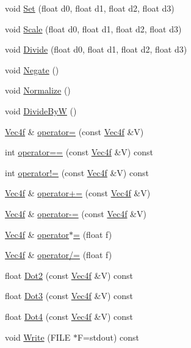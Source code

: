 \begin{DoxyCompactItemize}
\item 
void \hyperlink{classVec4f_aee24f98156cf8f6b7b2c82226c1b45b8}{Set} (float d0, float d1, float d2, float d3)
\item 
void \hyperlink{classVec4f_a4e278a1a03fc75d08b2479434d02a93b}{Scale} (float d0, float d1, float d2, float d3)
\item 
void \hyperlink{classVec4f_a15519ea147364b4f0f4d06f5ed2e84a0}{Divide} (float d0, float d1, float d2, float d3)
\item 
void \hyperlink{classVec4f_afde9b6639cddcd05e50939206070cae5}{Negate} ()
\item 
void \hyperlink{classVec4f_a778c0534a618a205c0e6d270d011a9f4}{Normalize} ()
\item 
void \hyperlink{classVec4f_a73189d23dbecc1961c06890d31eb7eec}{Divide\+By\+W} ()
\item 
\hyperlink{classVec4f}{Vec4f} \& \hyperlink{classVec4f_ad787eea4e2a08a293a21a00adaa52bfa}{operator=} (const \hyperlink{classVec4f}{Vec4f} \&V)
\item 
int \hyperlink{classVec4f_a39e556a72e87d2e7279bb6b743d7ff58}{operator==} (const \hyperlink{classVec4f}{Vec4f} \&V) const 
\item 
int \hyperlink{classVec4f_afd7d07212bb6dcfee2e98a22c163a902}{operator!=} (const \hyperlink{classVec4f}{Vec4f} \&V) const 
\item 
\hyperlink{classVec4f}{Vec4f} \& \hyperlink{classVec4f_a731b923867e74116577d8e6f7aab9b51}{operator+=} (const \hyperlink{classVec4f}{Vec4f} \&V)
\item 
\hyperlink{classVec4f}{Vec4f} \& \hyperlink{classVec4f_abe78d3c5c69e5669ca06c586ec66d59f}{operator-\/=} (const \hyperlink{classVec4f}{Vec4f} \&V)
\item 
\hyperlink{classVec4f}{Vec4f} \& \hyperlink{classVec4f_a13df49c47b3102d318e135839b81ca73}{operator$\ast$=} (float f)
\item 
\hyperlink{classVec4f}{Vec4f} \& \hyperlink{classVec4f_a4319a795f66c8aff5b48e8d3fc6e1bbb}{operator/=} (float f)
\item 
float \hyperlink{classVec4f_a7a3d362d70ab25253051eca6e6d556ae}{Dot2} (const \hyperlink{classVec4f}{Vec4f} \&V) const 
\item 
float \hyperlink{classVec4f_a470fe32036a3b5ed2ad420525fb9ae27}{Dot3} (const \hyperlink{classVec4f}{Vec4f} \&V) const 
\item 
float \hyperlink{classVec4f_a7b235edca512202fc421fed109ac1602}{Dot4} (const \hyperlink{classVec4f}{Vec4f} \&V) const 
\item 
void \hyperlink{classVec4f_a3968afdffe144e4b3e9d81ec8a2bc53c}{Write} (F\+I\+L\+E $\ast$F=stdout) const 
\end{DoxyCompactItemize}
